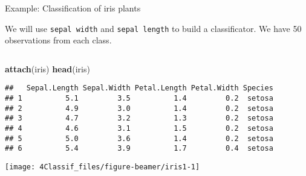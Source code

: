 \documentclass[10pt,ignorenonframetext,]{beamer}
\newenvironment{Shaded}{\begin{snugshade}}{\end{snugshade}}
\newcommand{\KeywordTok}[1]{\textcolor[rgb]{0.13,0.29,0.53}{\textbf{#1}}}
\newcommand{\NormalTok}[1]{#1}
\begin{document}
\begin{frame}[fragile]

\begin{block}{Example: Classification of iris plants}

\vspace{2mm}

We will use \texttt{sepal\ width} and \texttt{sepal\ length} to build a
classificator. We have 50 observations from each class.

\(~\)

\scriptsize

\begin{Shaded}
\begin{Highlighting}[]
\KeywordTok{attach}\NormalTok{(iris)}
\KeywordTok{head}\NormalTok{(iris)}
\end{Highlighting}
\end{Shaded}

\begin{verbatim}
##   Sepal.Length Sepal.Width Petal.Length Petal.Width Species
## 1          5.1         3.5          1.4         0.2  setosa
## 2          4.9         3.0          1.4         0.2  setosa
## 3          4.7         3.2          1.3         0.2  setosa
## 4          4.6         3.1          1.5         0.2  setosa
## 5          5.0         3.6          1.4         0.2  setosa
## 6          5.4         3.9          1.7         0.4  setosa
\end{verbatim}

\end{block}

\end{frame}

\begin{frame}

\begin{center}\texttt{[image: 4Classif\_files/figure-beamer/iris1-1]} \end{center}

\end{frame}
\end{document}
